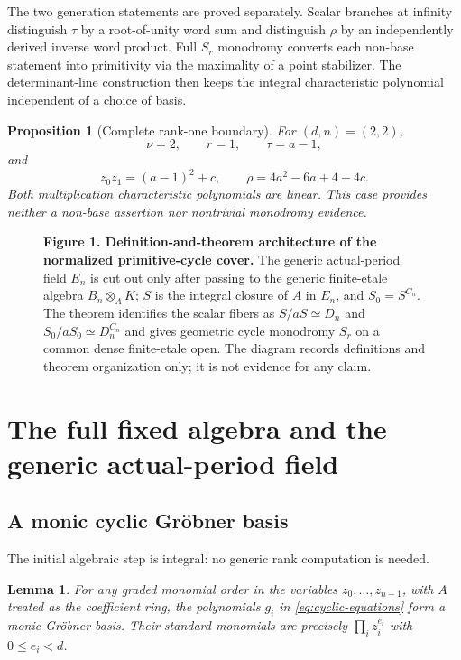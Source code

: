\documentclass[11pt]{article}
\newtheorem{proposition}[theorem]{Proposition}
\newtheorem{lemma}[theorem]{Lemma}
\theoremstyle{definition}
\theoremstyle{remark}
\begin{document}
The two generation statements are proved separately.  Scalar branches at
infinity distinguish $\tau$ by a root-of-unity word sum and distinguish
$\rho$ by an independently derived inverse word product.  Full $S_r$
monodromy converts each non-base statement into primitivity via the
maximality of a point stabilizer.  The determinant-line construction then
keeps the integral characteristic polynomial independent of a choice of
basis.

\begin{proposition}[Complete rank-one boundary]\label{prop:C}
For $(d,n)=(2,2)$,
\[
 \nu=2,\qquad r=1,\qquad \tau=a-1,
\]
and
\[
 z_0z_1=(a-1)^2+c,\qquad
 \rho=4a^2-6a+4+4c.
\]
Both multiplication characteristic polynomials are linear.  This case
provides neither a non-base assertion nor nontrivial monodromy evidence.
\end{proposition}

\begin{figure}[t]
\centering

\label{fig:architecture}
\caption*{\textbf{Figure 1. Definition-and-theorem architecture of the normalized primitive-cycle cover.} The generic actual-period field $E_n$ is cut out only after passing to the generic finite-etale algebra $B_n\otimes_AK$; $S$ is the integral closure of $A$ in $E_n$, and $S_0=S^{C_n}$. The theorem identifies the scalar fibers as $S/aS\simeq D_n$ and $S_0/aS_0\simeq D_n^{C_n}$ and gives geometric cycle monodromy $S_r$ on a common dense finite-etale open. The diagram records definitions and theorem organization only; it is not evidence for any claim.}
\end{figure}

\section{The full fixed algebra and the generic actual-period field}\label{sec:fixed}

\subsection{A monic cyclic Gr\"obner basis}

The initial algebraic step is integral: no generic rank computation is needed.

\begin{lemma}\label{lem:groebner}
For any graded monomial order in the variables $z_0,\ldots,z_{n-1}$, with
$A$ treated as the coefficient ring, the polynomials $g_i$ in
\eqref{eq:cyclic-equations} form a monic Gr\"obner basis.  Their standard
monomials are precisely $\prod_i z_i^{e_i}$ with $0\leq e_i<d$.
\end{lemma}
\end{document}
